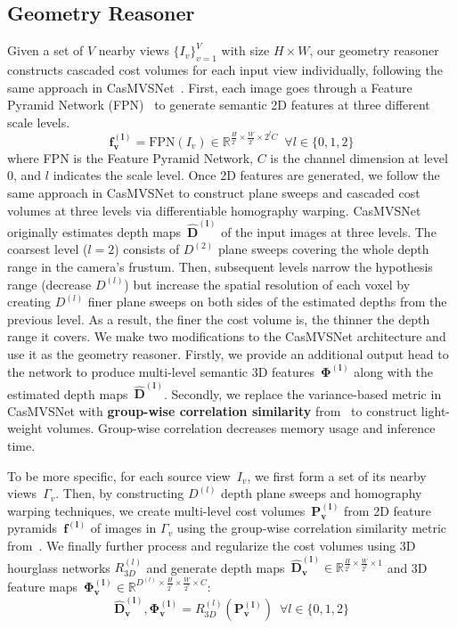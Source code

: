 \subsection{Geometry Reasoner} \label{sec:c3_geometry}
Given a set of $V$ nearby views $\{I_{v}\}_{v=1}^{V}$ with size $H \times W$, our geometry reasoner constructs cascaded cost volumes for each input view individually, following the same approach in CasMVSNet~\citep{gu2020cascade}. First, each image goes through a Feature Pyramid Network (FPN)~\citep{lin2017feature} to generate semantic 2D features at three different scale levels.
\begin{equation}
    \boldsymbol{f^{(l)}_{v}}=\text{FPN} \left( I_v \right) \in \mathbb{R}^{\frac{H}{2^l} \times \frac{W}{2^l} \times 2^lC} \phantom{0} \forall l \in \{0, 1, 2\}
\end{equation}
where FPN is the Feature Pyramid Network, $C$ is the channel dimension at level 0, and $l$ indicates the scale level. Once 2D features are generated, we follow the same approach in CasMVSNet to construct plane sweeps and cascaded cost volumes at three levels via differentiable homography warping. CasMVSNet originally estimates depth maps~$\boldsymbol{\hat{D}^{(l)}}$ of the input images at three levels. The coarsest level ($l=2$) consists of $D^{(2)}$ plane sweeps covering the whole depth range in the camera's frustum. Then, subsequent levels narrow the hypothesis range (decrease $D^{(l)}$) but increase the spatial resolution of each voxel by creating $D^{(l)}$ finer plane sweeps on both sides of the estimated depths from the previous level. As a result, the finer the cost volume is, the thinner the depth range it covers. We make two modifications to the CasMVSNet architecture and use it as the geometry reasoner. Firstly, we provide an additional output head to the network to produce multi-level semantic 3D features~$\boldsymbol{\Phi^{(l)}}$ along with the estimated depth maps~$\boldsymbol{\hat{D}^{(l)}}$. Secondly, we replace the variance-based metric in CasMVSNet with \textbf{group-wise correlation similarity} from~\cite{xu2020learning} to construct light-weight volumes. Group-wise correlation decreases memory usage and inference time.

To be more specific, for each source view~$I_{v}$, we first form a set of its nearby views~$\Gamma_{v}$. Then, by constructing $D^{(l)}$ depth plane sweeps and homography warping techniques, we create multi-level cost volumes~$\boldsymbol{P^{(l)}_{v}}$ from 2D feature pyramids~$\boldsymbol{f^{(l)}}$ of images in $\Gamma_{v}$ using the group-wise correlation similarity metric from~\cite{xu2020learning}. We finally further process and regularize the cost volumes using 3D hourglass networks $R^{(l)}_{3D}$ and generate depth maps~$\boldsymbol{\hat{D}^{(l)}_{v}} \in \mathbb{R}^{\frac{H}{2^l} \times \frac{W}{2^l} \times 1}$ and 3D feature maps~$\boldsymbol{\Phi^{(l)}_{v}} \in \mathbb{R}^{D^{(l)} \times \frac{H}{2^l} \times \frac{W}{2^l} \times C}$:
\begin{equation}
    \boldsymbol{\hat{D}^{(l)}_{v}}, \boldsymbol{\Phi^{(l)}_{v}}=R^{(l)}_{3D} \left( \boldsymbol{P^{(l)}_{v}} \right)  \phantom{0} \forall l \in \{0, 1, 2\}
\end{equation}

